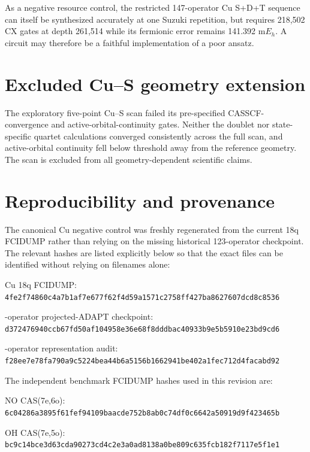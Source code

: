 \documentclass[
 aip,
 jcp,
 amsmath,amssymb,
 preprint
]{revtex4-2}
\begin{document}
As a negative resource control, the restricted 147-operator Cu S+D+T sequence can itself be synthesized accurately at one Suzuki repetition, but requires 218,502 CX gates at depth 261,514 while its fermionic error remains 141.392 m$E_h$.
A circuit may therefore be a faithful implementation of a poor ansatz.

\section{Excluded Cu--S geometry extension}

The exploratory five-point Cu--S scan failed its pre-specified CASSCF-convergence and active-orbital-continuity gates.
Neither the doublet nor state-specific quartet calculations converged consistently across the full scan, and active-orbital continuity fell below threshold away from the reference geometry.
The scan is excluded from all geometry-dependent scientific claims.

\section{Reproducibility and provenance}

The canonical Cu negative control was freshly regenerated from the current 18q FCIDUMP rather than relying on the missing historical 123-operator checkpoint.
The relevant hashes are listed explicitly below so that the exact files can be identified without relying on filenames alone:

\noindent Cu 18q FCIDUMP:\\
{\small\texttt{4fe2f74860c4a7b1af7e677f62f4d59a1571c2758ff427ba8627607dcd8c8536}}

-operator projected-ADAPT checkpoint:\\
{\small\texttt{d372476940ccb67fd50af104958e36e68f8dddbac40933b9e5b5910e23bd9cd6}}

-operator representation audit:\\
{\small\texttt{f28ee7e78fa790a9c5224bea44b6a5156b1662941be402a1fec712d4facabd92}}

The independent benchmark FCIDUMP hashes used in this revision are:

\noindent NO CAS(7e,6o):\\
{\small\texttt{6c04286a3895f61fef94109baacde752b8ab0c74df0c6642a50919d9f423465b}}

\noindent OH CAS(7e,5o):\\
{\small\texttt{bc9c14bce3d63cda90273cd4c2e3a0ad8138a0be809c635fcb182f7117e5f1e1}}
\end{document}
